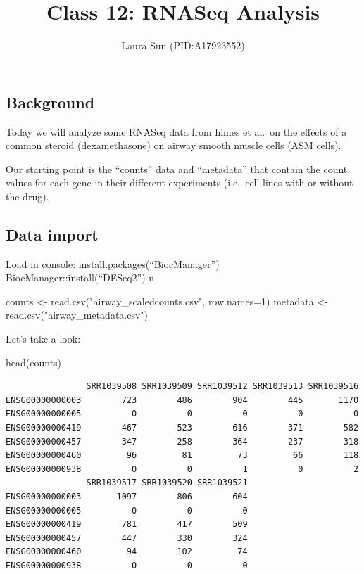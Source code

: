 \documentclass[
  letterpaper,
  DIV=11,
  numbers=noendperiod]{scrartcl}
\title{Class 12: RNASeq Analysis}
\author{Laura Sun (PID:A17923552)}
\date{}
\newenvironment{Shaded}{\begin{snugshade}}{\end{snugshade}}
\newcommand{\AttributeTok}[1]{\textcolor[rgb]{0.40,0.45,0.13}{#1}}
\newcommand{\DecValTok}[1]{\textcolor[rgb]{0.68,0.00,0.00}{#1}}
\newcommand{\FunctionTok}[1]{\textcolor[rgb]{0.28,0.35,0.67}{#1}}
\newcommand{\NormalTok}[1]{\textcolor[rgb]{0.00,0.23,0.31}{#1}}
\newcommand{\OtherTok}[1]{\textcolor[rgb]{0.00,0.23,0.31}{#1}}
\newcommand{\StringTok}[1]{\textcolor[rgb]{0.13,0.47,0.30}{#1}}
\renewcommand*\contentsname{Table of contents}
\newcommand\contentsname{Table of contents}
\begin{document}
\maketitle

\renewcommand*\contentsname{Table of contents}
{
\hypersetup{linkcolor=}
\setcounter{tocdepth}{3}
\tableofcontents
}

\subsection{Background}\label{background}

Today we will analyze some RNASeq data from himes et al.~on the effects
of a common steroid (dexamethasone) on airway smooth muscle cells (ASM
cells).

Our starting point is the ``counts'' data and ``metadata'' that contain
the count values for each gene in their different experiments (i.e.~cell
lines with or without the drug).

\subsection{Data import}\label{data-import}

Load in console: install.packages(``BiocManager'')
BiocManager::install(``DESeq2'') n

\begin{Shaded}
\begin{Highlighting}[]
\NormalTok{counts }\OtherTok{\textless{}{-}} \FunctionTok{read.csv}\NormalTok{(}\StringTok{"airway\_scaledcounts.csv"}\NormalTok{, }\AttributeTok{row.names=}\DecValTok{1}\NormalTok{)}
\NormalTok{metadata }\OtherTok{\textless{}{-}} \FunctionTok{read.csv}\NormalTok{(}\StringTok{"airway\_metadata.csv"}\NormalTok{)}
\end{Highlighting}
\end{Shaded}

Let's take a look:

\begin{Shaded}
\begin{Highlighting}[]
\FunctionTok{head}\NormalTok{(counts)}
\end{Highlighting}
\end{Shaded}

\begin{verbatim}
                SRR1039508 SRR1039509 SRR1039512 SRR1039513 SRR1039516
ENSG00000000003        723        486        904        445       1170
ENSG00000000005          0          0          0          0          0
ENSG00000000419        467        523        616        371        582
ENSG00000000457        347        258        364        237        318
ENSG00000000460         96         81         73         66        118
ENSG00000000938          0          0          1          0          2
                SRR1039517 SRR1039520 SRR1039521
ENSG00000000003       1097        806        604
ENSG00000000005          0          0          0
ENSG00000000419        781        417        509
ENSG00000000457        447        330        324
ENSG00000000460         94        102         74
ENSG00000000938          0          0          0
\end{verbatim}
\end{document}
